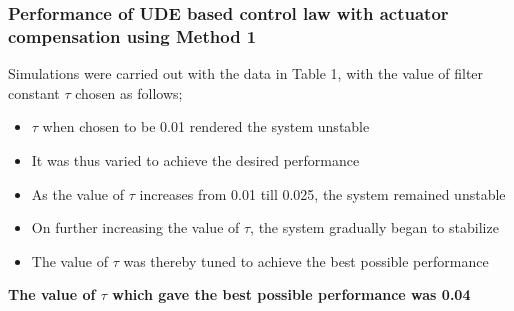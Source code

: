 \documentclass[table,10pt,red]{beamer}	%
\begin{document}
\begin{frame}
\frametitle{Performance of UDE based control law with actuator compensation using Method 1}
Simulations were carried out with the data in Table 1, with the value of filter constant $ \tau$ chosen as follows;
\begin{itemize}  %
		\item $\tau$ when chosen to be 0.01 rendered the system unstable
		\item It was thus varied to achieve the desired performance
		\item As the value of $\tau$ increases from 0.01 till 0.025, the system remained unstable
		\item On further increasing the value of $\tau$, the system gradually began to stabilize
		\item The value of $\tau$ was thereby tuned to achieve the best possible performance
\end{itemize}

\textbf{The value of $\tau$ which gave the best possible performance was 0.04 }
\end{frame}
\end{document}
